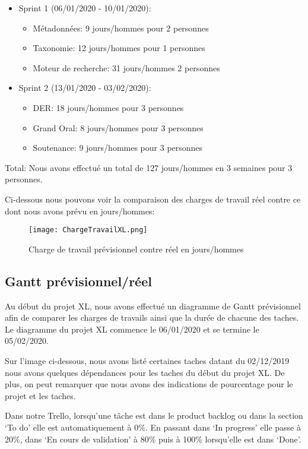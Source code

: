 \begin{itemize}
    \item Sprint 1 (06/01/2020 - 10/01/2020):
        \begin{itemize}
            \item Métadonnées: 9 jours/hommes pour 2 personnes
            \item Taxonomie: 12 jours/hommes pour 1 personnes
            \item Moteur de recherche: 31 jours/hommes 2 personnes
        \end{itemize}
    \item Sprint 2 (13/01/2020 - 03/02/2020):
    \begin{itemize}
        \item DER\@: 18 jours/hommes pour 3 personnes
        \item Grand Oral: 8 jours/hommes pour 3 personnes
        \item Soutenance:  9 jours/hommes pour 3 personnes
    \end{itemize}
\end{itemize} 

Total:  Nous avons effectué un total de 127 jours/hommes en 3 semaines pour 3 personnes.

Ci-dessous nous pouvons voir la comparaison des charges de travail réel contre ce dont nous avons prévu en jours/hommes: 

\begin{figure}[h!]
  \centering
  \texttt{[image: ChargeTravailXL.png]}
	\caption[]{Charge de travail prévisionnel contre réel en jours/hommes}
	\label{}
\end{figure}



\subsection{Gantt prévisionnel/réel}
Au début du projet XL, nous avons effectué un diagramme de Gantt prévisionnel afin de comparer les charges de travails ainsi que la durée de chacune des taches.
Le diagramme du projet XL commence le 06/01/2020 et se termine le 05/02/2020. 

Sur l'image ci-dessous, nous avons listé certaines taches datant du 02/12/2019 nous avons quelques dépendances pour les taches du début du projet XL\@.
De plus, on peut remarquer que nous avons des indications de pourcentage pour le projet et les taches.

Dans notre Trello, lorsqu'une tâche est dans le product backlog ou dans la section `To do' elle est automatiquement à 0\%.
En passant dans `In progress' elle passe à 20\%, dans `En cours de validation' à 80\% puis à 100\% lorsqu'elle est dans `Done'.

